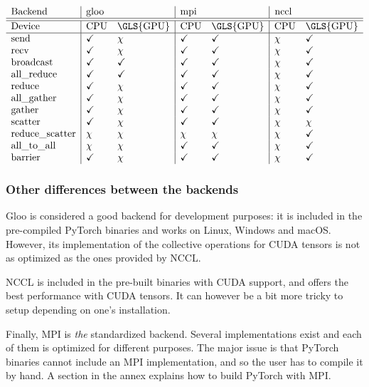 \documentclass{article}
\begin{document}
\[\begin{array}{l|ll|ll|ll}
  \text{Backend} & \text{\lstinline{gloo}} & & \text{\lstinline{mpi}} & & \text{\lstinline{nccl}} \\
  \hline\hline
  \text{Device} & \text{CPU} & \text{\GLS{GPU}} & \text{CPU} & \text{\GLS{GPU}} & \text{CPU} & \text{\GLS{GPU}} \\
  \hline
  \text{send} & \checkmark & \chi & \checkmark & \checkmark & \chi & \checkmark \\
  \text{recv} & \checkmark & \chi & \checkmark & \checkmark & \chi & \checkmark \\
  \text{broadcast} & \checkmark & \checkmark & \checkmark & \checkmark & \chi & \checkmark \\
  \text{all\_reduce} & \checkmark & \checkmark & \checkmark & \checkmark & \chi & \checkmark \\
  \text{reduce} & \checkmark & \chi & \checkmark & \checkmark & \chi & \checkmark \\
  \text{all\_gather} & \checkmark & \chi & \checkmark & \checkmark & \chi & \checkmark \\
  \text{gather} & \checkmark & \chi & \checkmark & \checkmark & \chi & \checkmark \\
  \text{scatter} & \checkmark & \chi & \checkmark & \checkmark & \chi & \chi \\
  \text{reduce\_scatter} & \chi & \chi & \chi & \chi & \chi & \checkmark \\
  \text{all\_to\_all} & \chi & \chi & \checkmark & \checkmark & \chi & \checkmark \\
  \text{barrier} & \checkmark & \chi & \checkmark & \checkmark & \chi & \checkmark
\end{array}\]

\subsubsection{Other differences between the backends}
Gloo is considered a good backend for development purposes: it is included in the pre-compiled PyTorch binaries and works on Linux, Windows and macOS. However, its implementation of the collective operations for CUDA tensors is not as optimized as the ones provided by NCCL.

NCCL is included in the pre-built binaries with CUDA support, and offers the best performance with CUDA tensors. It can however be a bit more tricky to setup depending on one's installation.

Finally, MPI is \textit{the} standardized backend. Several implementations exist and each of them is optimized for different purposes. The major issue is that PyTorch binaries cannot include an MPI implementation, and so the user has to compile it by hand. A section in the annex explains how to build PyTorch with MPI.
\end{document}
